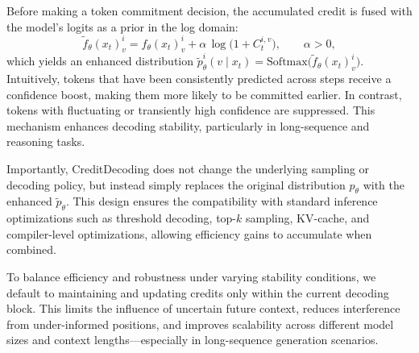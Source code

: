 \documentclass[]{antgroup}
\begin{document}
Before making a token commitment decision, the accumulated credit is fused with the model’s logits as a prior in the log domain:
\begin{equation}
\label{eq:logits-fuse}
\tilde f_\theta(x_t)^i_v = f_\theta(x_t)^i_v + \alpha\,\log\!\big(1 + C_t^{i,v}\big),\qquad \alpha > 0,
\end{equation}
which yields an enhanced distribution $\tilde p_\theta^i(v \mid x_t) = \mathrm{Softmax}\!\big(\tilde f_\theta(x_t)^i_v\big)$. Intuitively, tokens that have been consistently predicted across steps receive a confidence boost, making them more likely to be committed earlier. In contrast, tokens with fluctuating or transiently high confidence are suppressed. This mechanism enhances decoding stability, particularly in long-sequence and reasoning tasks.


Importantly, CreditDecoding does not change the underlying sampling or decoding policy, but instead simply replaces the original distribution $p_\theta$ with the enhanced $\tilde p_\theta$. This design ensures the compatibility with standard inference optimizations such as  threshold decoding, top-$k$ sampling, KV-cache, and compiler-level optimizations, allowing efficiency gains to accumulate when combined.

To balance efficiency and robustness under varying stability conditions, we default to maintaining and updating credits only within the current decoding block. This limits the influence of uncertain future context, reduces interference from under-informed positions, and improves scalability across different model sizes and context lengths—especially in long-sequence generation scenarios.
\end{document}
